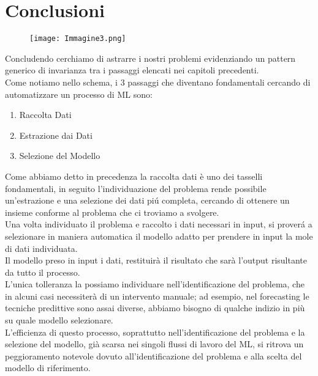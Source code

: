 \documentclass[../tesi.tex]{subfiles}
\begin{document}
  \section{Conclusioni}
\begin{figure}[htbp]
  \centering
  \texttt{[image: Immagine3.png]} 
  \end{figure}
Concludendo cerchiamo di astrarre i nostri problemi evidenziando un pattern generico di invarianza tra i passaggi elencati nei capitoli precedenti.\\
Come notiamo nello schema, i 3 passaggi che diventano fondamentali cercando di automatizzare un processo di ML sono:
\begin{enumerate}
  \item Raccolta Dati
  \item Estrazione dai Dati 
  \item Selezione del Modello
\end{enumerate}
Come abbiamo detto in precedenza la raccolta dati è uno dei tasselli fondamentali, in seguito l’individuazione del problema rende possibile un'estrazione e una selezione dei dati piú completa, cercando di ottenere un insieme conforme al problema che ci troviamo a svolgere.\\
Una volta individuato il problema e raccolto i dati necessari in input, si proverá a selezionare in maniera automatica il modello adatto per prendere in input la mole di dati individuata.\\
Il modello preso in input i dati, restituirà il risultato che sarà l’output risultante da tutto il processo.\\
L’unica tolleranza la possiamo individuare nell’identificazione del problema, che in alcuni casi necessiterà di un intervento manuale; ad esempio, nel forecasting le tecniche predittive sono assai diverse, abbiamo bisogno di qualche indizio in più su quale modello selezionare.\\
L’efficienza di questo processo, soprattutto nell’identificazione del problema e la selezione del modello, già scarsa nei singoli flussi di lavoro del ML, si ritrova un peggioramento notevole dovuto all’identificazione del problema e alla scelta del modello di riferimento.
\end{document}
